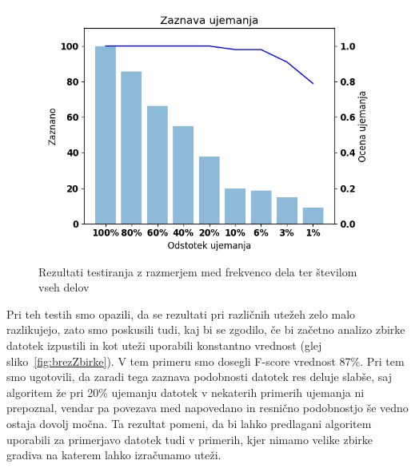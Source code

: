 \documentclass{acm_proc_article-sp}
\begin{document}
\begin{figure}[htb]
\begin{center}
\includegraphics[width=1\columnwidth]{ch_freq_weight.png}
\end{center}
\caption{\small{Rezultati testiranja z razmerjem med frekvenco dela ter številom vseh delov}}
\label{fig:ch_freq}
\end{figure}

Pri teh testih smo opazili, da se rezultati pri različnih utežeh zelo malo razlikujejo, zato smo poskusili tudi, kaj bi se zgodilo, če bi začetno analizo zbirke datotek izpustili in kot uteži uporabili konstantno vrednost (glej sliko~\ref{fig:brezZbirke}). V tem primeru smo dosegli F-score vrednost 87\%. Pri tem smo ugotovili, da zaradi tega zaznava podobnosti datotek res deluje slabše, saj algoritem že pri 20\% ujemanju datotek v nekaterih primerih ujemanja ni prepoznal, vendar pa povezava med napovedano in resnično podobnostjo še vedno ostaja dovolj močna. Ta rezultat pomeni, da bi lahko predlagani algoritem uporabili za primerjavo datotek tudi v primerih, kjer nimamo velike zbirke gradiva na katerem lahko izračunamo uteži.
\end{document}
